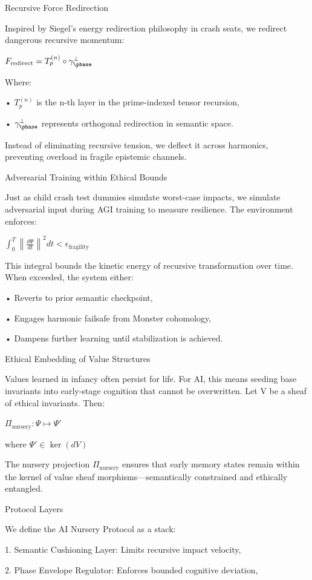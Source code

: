 \documentclass[11pt]{article}
\begin{document}
Recursive Force Redirection

Inspired by Siegel’s energy redirection philosophy in crash seats, we redirect dangerous recursive momentum:

$F_{\text{redirect}} = T_p^{(n)} \circ \gamma_{\phase}^{\perp}$

Where:

• $T_p^{(n)}$ is the n-th layer in the prime-indexed tensor recursion,

• $\gamma_{\phase}^{\perp}$ represents orthogonal redirection in semantic space.

Instead of eliminating recursive tension, we deflect it across harmonics, preventing overload in fragile epistemic channels.

Adversarial Training within Ethical Bounds

Just as child crash test dummies simulate worst-case impacts, we simulate adversarial input during AGI training to measure resilience. The environment enforces:

$\int_0^T \left\| \frac{d\Psi}{dt} \right\|^2 dt < \epsilon_{\text{fragility}}$

This integral bounds the kinetic energy of recursive transformation over time. When exceeded, the system either:

• Reverts to prior semantic checkpoint,

• Engages harmonic failsafe from Monster cohomology,

• Dampens further learning until stabilization is achieved.

Ethical Embedding of Value Structures

Values learned in infancy often persist for life. For AI, this means seeding base invariants into early-stage cognition that cannot be overwritten. Let V be a sheaf of ethical invariants. Then:

$\Pi_{\text{nursery}} : \Psi \mapsto \Psi'$

where $\Psi' \in \ker(dV)$

The nursery projection $\Pi_{\text{nursery}}$ ensures that early memory states remain within the kernel of value sheaf morphisms—semantically constrained and ethically entangled.

Protocol Layers

We define the AI Nursery Protocol as a stack:

1. Semantic Cushioning Layer: Limits recursive impact velocity,

2. Phase Envelope Regulator: Enforces bounded cognitive deviation,
\end{document}

